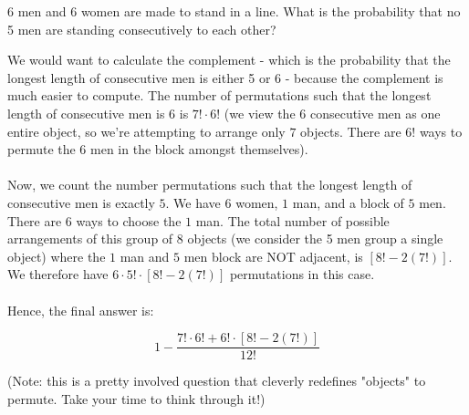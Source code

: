 \documentclass[11pt]{article}
\begin{document}
\begin{exercise}[Homework!]
6 men and 6 women are made to stand in a line. What is the probability that no 5 men are standing consecutively to each other?
\end{exercise}
\begin{solution}
We would want to calculate the complement - which is the probability that the longest length of consecutive men is either 5 or 6 - because the complement is much easier to compute. The number of permutations such that the longest length of consecutive men is 6 is $7! \cdot 6!$ (we view the 6 consecutive men as one entire object, so we're attempting to arrange only $7$ objects. There are $6!$ ways to permute the 6 men in the block amongst themselves).\\
\\
Now, we count the number permutations such that the longest length of consecutive men is exactly $5$. We have $6$ women, $1$ man, and a block of $5$ men. There are $6$ ways to choose the $1$ man. The total number of possible arrangements of this group of 8 objects (we consider the 5 men group a single object) where the $1$ man and $5$ men block are NOT adjacent, is $[8! - 2(7!)]$. We therefore have $6 \cdot 5! \cdot [8! - 2(7!)]$ permutations in this case.\\
\\
Hence, the final answer is:

$$1 - \frac{7! \cdot 6! + 6! \cdot [8! - 2(7!)]}{12!}$$

(Note: this is a pretty involved question that cleverly redefines "objects" to permute. Take your time to think through it!)

\end{solution}
\end{document}
